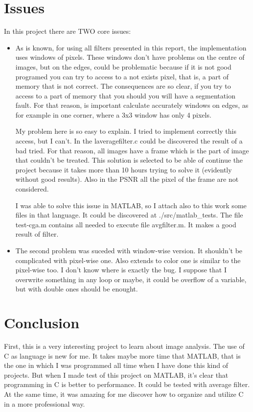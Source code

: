 \documentclass[a4paper,11pt,final]{article}
\begin{document}
\section{Issues}
In this project there are TWO core issues:
\begin{itemize}
	\item	As is known, for using all filters presented in this report, the implementation uses windows of pixels. These windows don't have problems on the centre of images, but on the edges, could be problematic because if it is not good programed you can try to access to a not exists pixel, that is, a part of memory that is not correct. The consequences are so clear, if you try to access to a part of memory that you should you will have a segmentation fault. For that reason, is important calculate accurately windows on edges, as for example in one corner, where a 3x3 window has only 4 pixels. 

My problem here is so easy to explain. I tried to implement correctly this access, but I can't. In the {\ttfamily laveragefilter.c} could be discovered the result of a bad tried. For that reason, all images have a frame which is the part of image that couldn't be treated. This solution is selected to be able of continue the project because it takes more than 10 hours trying to solve it (evidently without good results). Also in the PSNR all the pixel of the frame are not considered.

I was able to solve this issue in MATLAB, so I attach also to this work some files in that language. It could be discovered at {\ttfamily ./src/matlab\_tests}. The file {\ttfamily test-cga.m} contains all needed to execute file  {\ttfamily avgfilter.m}. It makes a good result of filter.

	\item The second problem was suceded with window-wise version. It shouldn't be complicated with pixel-wise one. Also extends to color one is similar to the pixel-wise too. I don't know where is exactly the bug. I suppose that I overwrite something in any loop or maybe, it could be overflow of a variable, but with {\ttfamily double} ones should be enought.
\end{itemize}

\section{Conclusion}

First, this is a very interesting project to learn about image analysis. The use of C as language is new for me. It takes maybe more time that MATLAB, that is the one in which I was programmed all time when I have done this kind of projects. But when I made test of this project on MATLAB, it's clear that programming in C is better to performance. It could be tested with average filter. At the same time, it was amazing for me discover how to organize and utilize C in a more professional way.
\end{document}
